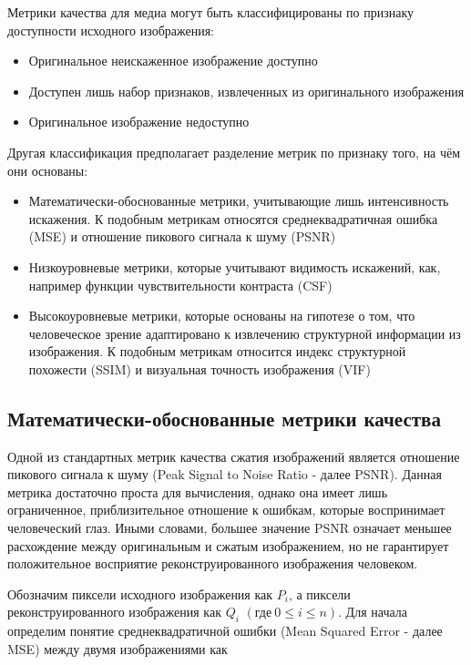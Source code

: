 Метрики качества для медиа могут быть классифицированы по признаку доступности
исходного изображения\cite{SSIMArticle}:

\begin{itemize}
    \item Оригинальное неискаженное изображение доступно
    \item Доступен лишь набор признаков, извлеченных из оригинального изображения
    \item Оригинальное изображение недоступно
\end{itemize}

Другая классификация предполагает разделение метрик по признаку того, на чём они
основаны\cite[6]{FullReferenceIQMetrics}:

\begin{itemize}
    \item Математически-обоснованные метрики, учитывающие лишь интенсивность
    искажения. К подобным метрикам относятся среднеквадратичная ошибка (MSE) и
    отношение пикового сигнала к шуму (PSNR)
    \item Низкоуровневые метрики, которые учитывают видимость искажений, как,
    например функции чувствительности контраста (CSF)
    \item Высокоуровневые метрики, которые основаны на гипотезе о том, что
    человеческое зрение адаптировано к извлечению структурной информации из
    изображения. К подобным метрикам относится индекс структурной похожести
    (SSIM) и визуальная точность изображения (VIF)
\end{itemize}

\subsection{Математически-обоснованные метрики качества}

Одной из стандартных метрик качества сжатия изображений является отношение
пикового сигнала к шуму (Peak Signal to Noise Ratio - далее PSNR). Данная
метрика достаточно проста для вычисления, однако она имеет лишь ограниченное,
приблизительное отношение к ошибкам, которые воспринимает человеческий глаз.
Иными словами, большее значение PSNR означает меньшее расхождение между
оригинальным и сжатым изображением, но не гарантирует положительное восприятие
реконструированного изображения человеком\cite[279]{DataCompression}.

Обозначим пиксели исходного изображения как $P_{i}$, а пиксели
реконструированного изображения как $Q_{i}$ $\left(\text{где} \ 0 \le i \le
n\right)$. Для начала определим понятие среднеквадратичной ошибки (Mean Squared
Error - далее MSE) между двумя изображениями как

